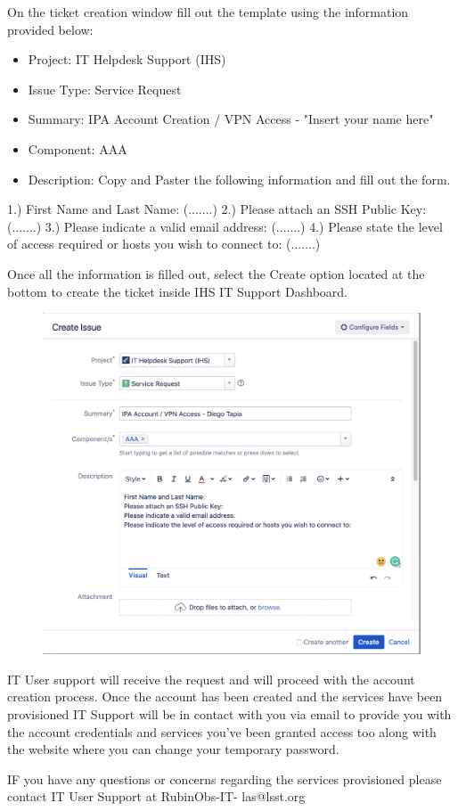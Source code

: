 On the ticket creation window fill out the template using the information provided below:

\begin{itemize}
  \item Project: IT Helpdesk Support (IHS)
  \item Issue Type: Service Request
  \item Summary: IPA Account Creation / VPN Access - "Insert your name here"
  \item Component: AAA
  \item Description: Copy and Paster the following information and fill out the form.
\end{itemize}

1.) First Name and Last Name: (.......)
2.) Please attach an SSH Public Key: (.......)
3.) Please indicate a valid email address: (.......)
4.) Please state the level of access required or hosts you wish to connect to: (.......)

Once all the information is filled out, select the Create option located at the bottom to create the ticket inside IHS IT Support Dashboard.

\begin{figure}
  \includegraphics[width=15cm]{Images/example3.png}
  \centering
\end{figure}

IT User support will receive the request and will proceed with the account creation process. Once the account has been created and the services have been provisioned IT Support will be in contact with you via email to provide you with the account credentials and services you've been granted access too along with the website where you can change your temporary password.


IF you have any questions or concerns regarding the services provisioned please contact IT User Support at RubinObs-IT- las@lsst.org
